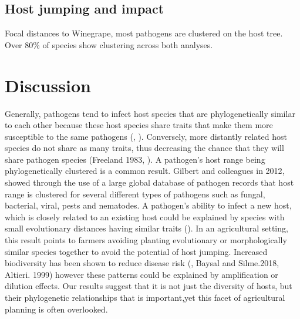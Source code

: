\documentclass[12pt,letter]{article}
\begin{document}
\subsection{Host jumping and impact}
Focal distances to Winegrape, most pathogens are clustered on the host tree. Over 80\% of species show clustering across both analyses. 

\section{Discussion}
 Generally, pathogens tend to infect host species that are phylogenetically similar to each other because these host species share traits that make them more susceptible to the same pathogens (\cite{Davies2008}, \cite{Poulin1995}). Conversely, more distantly related host species do not share as many traits, thus decreasing the chance that they will share pathogen species (Freeland 1983, \cite{Davies2008}). A pathogen's host range being phylogenetically clustered is a common result. Gilbert and colleagues in 2012\cite{Gilbert2012}, showed through the use of a large global database of pathogen records that host range is clustered for several different types of pathogens such as fungal, bacterial, viral, pests and nematodes. A pathogen's ability to infect a new host, which is closely related to an existing host could be explained by species with small evolutionary distances having similar traits (\cite{Pearse2009}). In an agricultural setting, this result points to farmers avoiding planting evolutionary or morphologically similar species together to avoid the potential of host jumping. Increased biodiversity has been shown to reduce disease risk (\cite{Pagan2012}, Baysal and Silme.2018, Altieri. 1999) however these patterns could be explained by amplification or dilution effects. Our results suggest that it is not just the diversity of hosts, but their phylogenetic relationships that is important,yet this facet of agricultural planning is often overlooked.  
\end{document}
